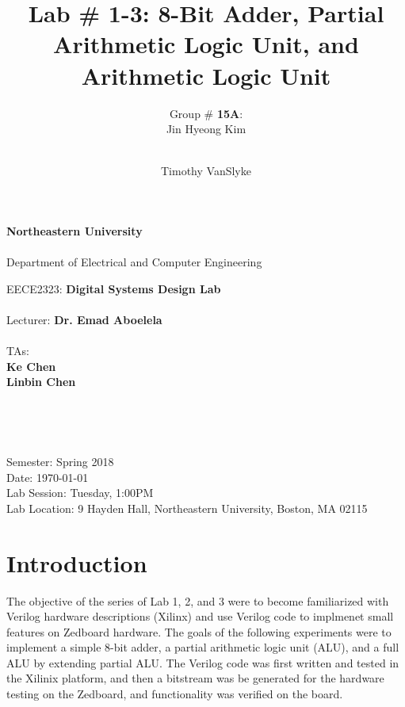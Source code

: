 \documentclass[12pt, letterpaper]{article}
\title{Lab \# 1-3: \textbf{8-Bit Adder, Partial Arithmetic Logic Unit, and Arithmetic Logic Unit}}
\author{Group \# \textbf{15A}:\\ Jin Hyeong Kim \and\\ Timothy VanSlyke}
\begin{document}
\begin{titlepage}
	\begin{center}
		{\Large
			\textbf{Northeastern University}\\
			~\\
			Department of Electrical and Computer Engineering\\ 
		}

		\vfill

		{\large
			EECE2323: \textbf{Digital Systems Design Lab}\\
			~\\
			Lecturer: \textbf{Dr. Emad Aboelela}\\
			~\\
			TAs:\\
			\textbf{Ke Chen}\\
			\textbf{Linbin Chen}\\
		}
	
		\vfill

		{\Large \thetitle}\\
	
		\vfill

		{\large \theauthor}\\

		\vfill

		{\large
			Semester: Spring 2018\\
			Date: \today\\
			Lab Session: Tuesday, 1:00PM\\ 
			Lab Location: 9 Hayden Hall, Northeastern University, Boston, MA 02115\\
		}

	\end{center}
\end{titlepage}

\hypersetup{linkcolor=black}
\tableofcontents
\hypersetup{linkcolor=cyan}

\newpage
\section{Introduction}
\begin{flushleft} 
\doublespacing The objective of the series of Lab 1, 2, and 3 were to become familiarized with Verilog hardware descriptions (Xilinx) and use Verilog code to implmenet small features on Zedboard hardware. The goals of the following experiments were to implement a simple 8-bit adder, a partial arithmetic logic unit (ALU), and a full ALU by extending partial ALU. The Verilog code was first written and tested in the Xilinix platform, and then a bitstream was be generated for the hardware testing on the Zedboard, and functionality was verified on the board.
\end{flushleft}
\end{document}
